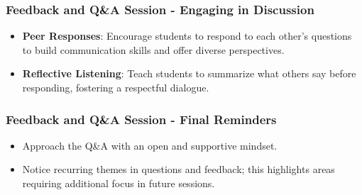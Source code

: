\documentclass[aspectratio=169]{beamer}
\begin{document}
\begin{frame}[fragile]
    \frametitle{Feedback and Q\&A Session - Engaging in Discussion}
    \begin{itemize}
        \item \textbf{Peer Responses}: Encourage students to respond to each other’s questions to build communication skills and offer diverse perspectives.
        \item \textbf{Reflective Listening}: Teach students to summarize what others say before responding, fostering a respectful dialogue.
    \end{itemize}
\end{frame}

\begin{frame}[fragile]
    \frametitle{Feedback and Q\&A Session - Final Reminders}
    \begin{itemize}
        \item Approach the Q\&A with an open and supportive mindset.
        \item Notice recurring themes in questions and feedback; this highlights areas requiring additional focus in future sessions.
    \end{itemize}
\end{frame}
\end{document}
